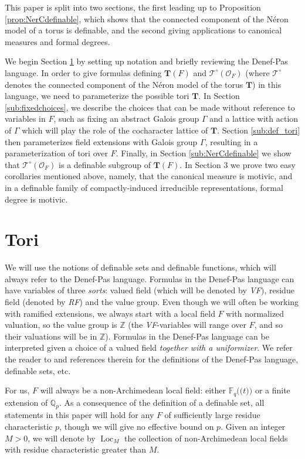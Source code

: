 \documentclass{amsart}
\newcommand{\Q}{{\mathbb Q}}
\newcommand{\F}{{\mathbb F}}
\newcommand{\Z}{{\mathbb Z}}
\newcommand{\ri}{\mathcal{O}}
\DeclareMathOperator{\loc}{Loc}
\newcommand{\bT}{\mathbf {T}}
\newcommand{\NerC}[1]{\mathcal{#1}^\circ}
\def\llp{\mathopen{(\!(}}
\def\rrp{\mathopen{)\!)}}
\theoremstyle{plain}
\theoremstyle{definition}
\begin{document}
This paper is split into two sections, the first leading up to Proposition \ref{prop:NerCdefinable},
which shows that the connected component of the N\'eron model of a torus is definable,
and the second giving applications to canonical measures and formal degrees.

We begin Section \ref{sec:tori} by setting up notation and briefly reviewing the Denef-Pas language.  In order
to give formulas defining $\bT(F)$ and $\NerC{T}(\ri_F)$  (where $\NerC{T}$ denotes the connected
component of the N\'eron model of the torus $\bT$) in this language, we need to parameterize the possible tori $\bT$.
In Section \ref{sub:fixedchoices}, we describe the choices that can be made without reference to variables in $F$,
such as fixing an abstract Galois group $\Gamma$ and a lattice with action of $\Gamma$ which will play the role of the cocharacter lattice of $\bT$.
Section \ref{sub:def_tori} then parameterizes field extensions with Galois group $\Gamma$, resulting in a parameterization
of tori over $F$.  Finally, in Section \ref{sub:NerCdefinable} we show that $\NerC{T}(\ri_F)$ is a definable subgroup of $\bT(F)$.
In Section 3 we prove two easy corollaries mentioned above, namely, that the canonical measure is motivic,
and in a definable family of compactly-induced irreducible representations, formal degree is motivic. 

\section{Tori} \label{sec:tori}
We will use the notions of definable sets and definable functions, which will always refer to the Denef-Pas language. 
Formulas in the Denef-Pas language can have variables of three \emph{sorts}: valued field (which will be denoted by \emph{VF}),
residue field (denoted by \emph{RF}) and the value group. Even though we will often be working with ramified extensions,
we always start with a local field $F$ with normalized valuation, so the value group is $\Z$
(the \emph{VF}-variables will range over $F$, and so their valuations will be in $\Z$).
Formulas in the Denef-Pas language can be interpreted given a choice of a valued field \emph{together with a uniformizer}. 
We refer the reader to \cite{CGH-ad} and references therein for the definitions of the Denef-Pas language, definable sets, etc. 

For us, $F$ will always be a non-Archimedean local field: either $\F_q\llp t\rrp$ or a finite extension of $\Q_p$.
As a consequence of the definition of a definable set, all statements in this paper will hold for any $F$ of sufficiently large residue characteristic $p$, 
though we will give no effective bound on $p$. 
Given an integer $M>0$, we will denote by $\loc_M$ the collection of non-Archimedean local fields
with residue characteristic greater than $M$. 
\end{document}
